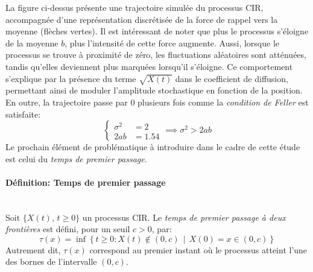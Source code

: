 \FloatBarrier La figure ci-dessus présente une trajectoire simulée du processus \acs{CIR}, accompagnée d'une représentation discrétisée de la force de rappel vers la moyenne (flèches vertes). Il est intéressant de noter que plus le processus s'éloigne de la moyenne $b$, plus l'intensité de cette force augmente. Aussi, lorsque le processus se trouve à proximité de zéro, les fluctuations aléatoires sont atténuées, tandis qu'elles deviennent plus marquées lorsqu'il s'éloigne. Ce comportement s'explique par la présence du terme \(\sqrt{X(t)}\) dans le coefficient de diffusion, permettant ainsi de moduler l'amplitude stochastique en fonction de la position. En outre, la trajectoire passe par 0 plusieurs fois comme la \textit{condition de Feller} est satisfaite:
\[
\left\{\begin{aligned}
    \sigma^2&=2\\
    2ab&=1.54
\end{aligned}\right.\implies\sigma^2 > 2ab
\]
Le prochain élément de problématique à introduire dans le cadre de cette étude est celui du \textit{temps de premier passage}.
\paragraph{Définition: Temps de premier passage}\mbox{}\\
Soit $\{X(t),\, t \geq 0\}$ un processus \acs{CIR}. Le \textit{temps de premier passage à deux frontières} est défini, pour un seuil $c > 0$, par:
\begin{equation}\label{fpt_definition}
    \tau(x) = \inf \left\{ t \geq 0: X(t) \notin (0, c) \,\middle|\, X(0) = x \in (0, c) \right\}
\end{equation}
Autrement dit, $\tau(x)$ correspond au premier instant où le processus atteint l'une des bornes de l'intervalle $(0, c)$. 

